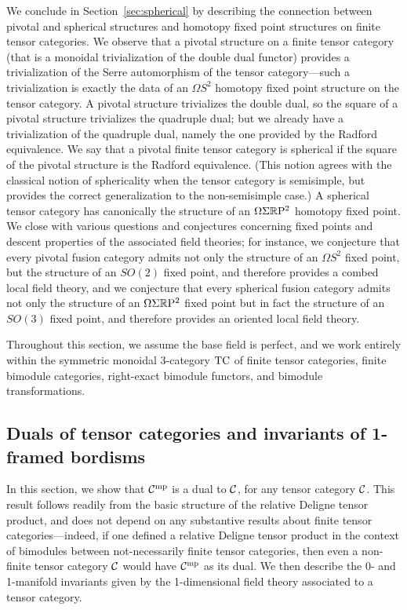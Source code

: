 \documentclass{amsart}
\begin{document}
We conclude in Section~\ref{sec:spherical} by describing the connection between pivotal and spherical structures and homotopy fixed point structures on finite tensor categories.  We observe that a pivotal structure on a finite tensor category (that is a monoidal trivialization of the double dual functor) provides a trivialization of the Serre automorphism of the tensor category---such a trivialization is exactly the data of an $\Omega S^2$ homotopy fixed point structure on the tensor category.  A pivotal structure trivializes the double dual, so the square of a pivotal structure trivializes the quadruple dual; but we already have a trivialization of the quadruple dual, namely the one provided by the Radford equivalence.  We say that a pivotal finite tensor category is spherical if the square of the pivotal structure is the Radford equivalence.  (This notion agrees with the classical notion of sphericality when the tensor category is semisimple, but provides the correct generalization to the non-semisimple case.)  A spherical tensor category has canonically the structure of an $\Omega \Sigma \mathbb R \mathrm{P}^2$ homotopy fixed point.  We close with various questions and conjectures concerning fixed points and descent properties of the associated field theories; for instance, we conjecture that every pivotal fusion category admits not only the structure of an $\Omega S^2$ fixed point, but the structure of an $SO(2)$ fixed point, and therefore provides a combed local field theory, and we conjecture that every spherical fusion category admits not only the structure of an $\Omega \Sigma \mathbb R \mathrm{P}^2$ fixed point but in fact the structure of an $SO(3)$ fixed point, and therefore provides an oriented local field theory.

Throughout this section, we assume the base field is perfect, and we work entirely within the symmetric monoidal 3-category $\mathrm{TC}$ of finite tensor categories, finite bimodule categories, right-exact bimodule functors, and bimodule transformations.



\subsection{Duals of tensor categories and invariants of 1-framed bordisms} \label{sec:df-objects}


In this section, we show that $\mathcal C^{\mathrm{mp}}$ is a dual to $\mathcal C$, for any tensor category $\mathcal C$.  This result follows readily from the basic structure of the relative Deligne tensor product, and does not depend on any substantive results about finite tensor categories---indeed, if one defined a relative Deligne tensor product in the context of bimodules between not-necessarily finite tensor categories, then even a non-finite tensor category $\mathcal C$ would have $\mathcal C^{\mathrm{mp}}$ as its dual.  We then describe the 0- and 1-manifold invariants given by the 1-dimensional field theory associated to a tensor category.
\end{document}
